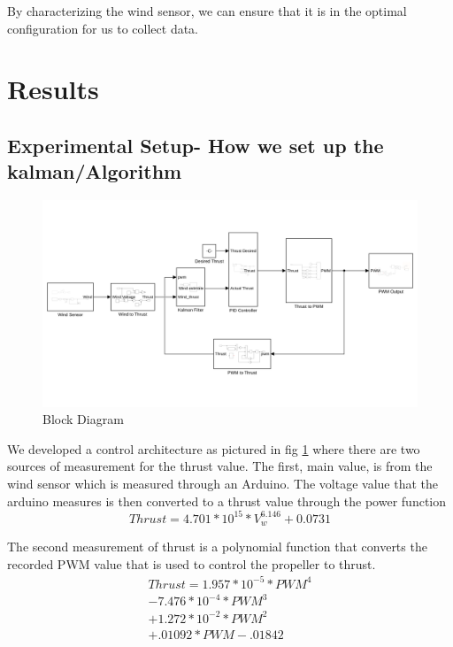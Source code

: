 \documentclass[twocolumn]{article}
\begin{document}
	By characterizing the wind sensor, we can ensure that it is in the optimal configuration for us to collect data.
	
	\section{Results}
	
	\subsection{Experimental Setup- How we set up the kalman/Algorithm}
	\begin{figure}[b]
		\includegraphics[width=\textwidth]{block_diagram}
		\caption{Block Diagram}
		\label{block_diagram}
	\end{figure}

	We developed a control architecture as pictured in fig \ref{block_diagram} where there are two sources of measurement for the thrust value. The first, main value, is from the wind sensor which is measured through an Arduino. The voltage value that the arduino measures is then converted to a thrust value through the power function
	\begin{equation}
	Thrust = 4.701 * 10^{15} * V_w^{6.146} + 0.0731
	\label{wind_power}
	\end{equation}
	
	The second measurement of thrust is a polynomial function that converts the recorded PWM value that is used to control the propeller to thrust. \newline
	\begin{eqnarray}
	Thrust = 1.957*10^{-5}*PWM^4 \\
	- 7.476*10^{-4}*PWM^3 \nonumber\\ 
	+ 1.272*10^{-2}*PWM^2 \nonumber\\
	+ .01092*PWM - .01842 \nonumber
	\label{pwm_poly}
	\end{eqnarray}
	
\end{document}
